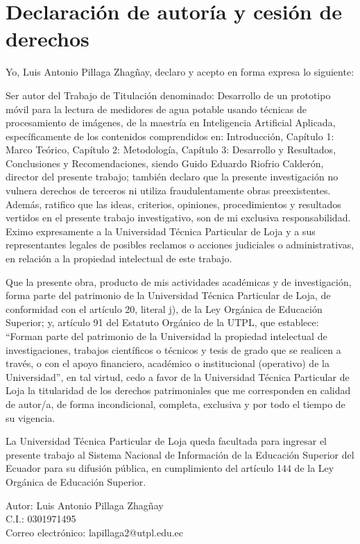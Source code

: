 \chapter*{Declaración de autoría y cesión de derechos}

Yo, Luis Antonio Pillaga Zhagñay, declaro y acepto en forma expresa lo siguiente:

Ser autor del Trabajo de Titulación denominado: Desarrollo de un prototipo móvil para la lectura de medidores de agua potable usando técnicas de procesamiento de imágenes, de la maestría en Inteligencia Artificial Aplicada, específicamente de los contenidos comprendidos en: Introducción, Capítulo 1: Marco Teórico, Capítulo 2: Metodología, Capítulo 3: Desarrollo y Resultados, Conclusiones y Recomendaciones, siendo Guido Eduardo Riofrio Calderón, director del presente trabajo; también declaro que la presente investigación no vulnera derechos de terceros ni utiliza fraudulentamente obras preexistentes. Además, ratifico que las ideas, criterios, opiniones, procedimientos y resultados vertidos en el presente trabajo investigativo, son de mi exclusiva responsabilidad. Eximo expresamente a la Universidad Técnica Particular de Loja y a sus representantes legales de posibles reclamos o acciones judiciales o administrativas, en relación a la propiedad intelectual de este trabajo.

Que la presente obra, producto de mis actividades académicas y de investigación, forma parte del patrimonio de la Universidad Técnica Particular de Loja, de conformidad con el artículo 20, literal j), de la Ley Orgánica de Educación Superior; y, artículo 91 del Estatuto Orgánico de la UTPL, que establece: ``Forman parte del patrimonio de la Universidad la propiedad intelectual de investigaciones, trabajos científicos o técnicos y tesis de grado que se realicen a través, o con el apoyo financiero, académico o institucional (operativo) de la Universidad'', en tal virtud, cedo a favor de la Universidad Técnica Particular de Loja la titularidad de los derechos patrimoniales que me corresponden en calidad de autor/a, de forma incondicional, completa, exclusiva y por todo el tiempo de su vigencia.

La Universidad Técnica Particular de Loja queda facultada para ingresar el presente trabajo al Sistema Nacional de Información de la Educación Superior del Ecuador para su difusión pública, en cumplimiento del artículo 144 de la Ley Orgánica de Educación Superior.

\vspace{2.5cm}

\noindent
Autor: Luis Antonio Pillaga Zhagñay\\
C.I.: 0301971495\\
Correo electrónico: lapillaga2@utpl.edu.ec